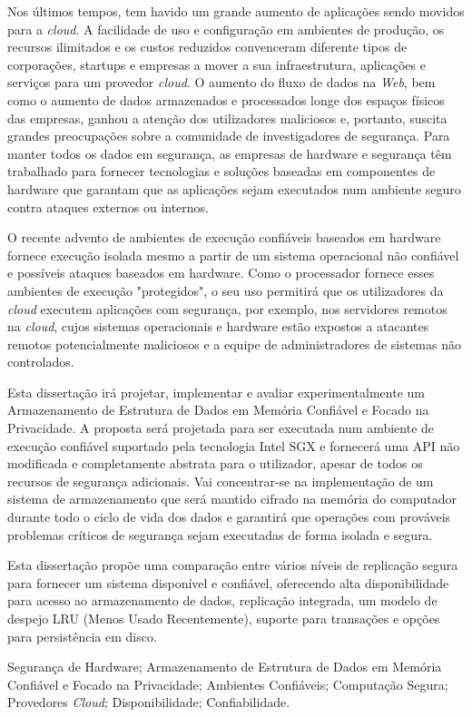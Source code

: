 Nos últimos tempos, tem havido um grande aumento de aplicações sendo movidos para a \textit{cloud}. A facilidade de uso e configuração em ambientes de produção, os recursos ilimitados e os custos reduzidos convenceram diferente tipos de corporações, startups e empresas a mover a sua infraestrutura, aplicações e serviços para um provedor \textit{cloud}. O aumento do fluxo de dados na \textit{Web}, bem como o aumento de dados armazenados e processados ​​longe dos espaços físicos das empresas, ganhou a atenção dos utilizadores maliciosos e, portanto, suscita grandes preocupações sobre a comunidade de investigadores de segurança. Para manter todos os dados em segurança, as empresas de hardware e segurança têm trabalhado para fornecer tecnologias e soluções baseadas em componentes de hardware que garantam que as aplicações sejam executados num ambiente seguro contra ataques externos ou internos.

O recente advento de ambientes de execução confiáveis ​​baseados em hardware fornece execução isolada mesmo a partir de um sistema operacional não confiável e possíveis ataques baseados em hardware. Como o processador fornece esses ambientes de execução "protegidos", o seu uso permitirá que os utilizadores da \textit{cloud} executem aplicações com segurança, por exemplo, nos servidores remotos na \textit{cloud}, cujos sistemas operacionais e hardware estão expostos a atacantes remotos potencialmente maliciosos e a equipe de administradores de sistemas não controlados.

Esta dissertação irá projetar, implementar e avaliar experimentalmente um Armazenamento de Estrutura de Dados em Memória Confiável e Focado na Privacidade. A proposta será projetada para ser executada num ambiente de execução confiável suportado pela tecnologia Intel SGX e fornecerá uma API não modificada e completamente abstrata para o utilizador, apesar de todos os recursos de segurança adicionais. Vai concentrar-se na implementação de um sistema de armazenamento que será mantido cifrado na memória do computador durante todo o ciclo de vida dos dados e garantirá que operações com prováveis problemas críticos de segurança sejam executadas de forma isolada e segura.

Esta dissertação propõe uma comparação entre vários níveis de replicação segura para fornecer um sistema disponível e confiável, oferecendo alta disponibilidade para acesso ao armazenamento de dados, replicação integrada, um modelo de despejo LRU (Menos Usado Recentemente), suporte para transações e opções para persistência em disco.

\begin{keywords}
Segurança de Hardware; Armazenamento de Estrutura de Dados em Memória Confiável e Focado na Privacidade; Ambientes Confiáveis; Computação Segura; Provedores \textit{Cloud}; Disponibilidade; Confiabilidade.
\end{keywords} 
